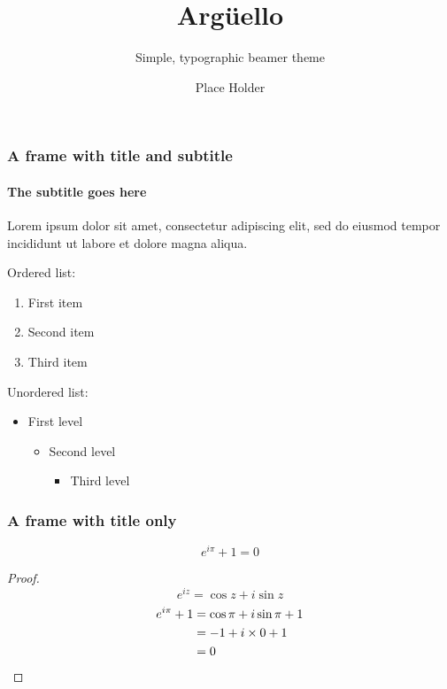 \documentclass{beamer}
\title{Argüello}
\subtitle{Simple, typographic beamer theme}
\date{}
\author{Place Holder}
\institute{University of \TeX\par\email{username@domain.com}}
\begin{document}
\frame[plain]{\titlepage}


\begin{frame}
    \frametitle{A frame with title and subtitle}
    \framesubtitle{The subtitle goes here}
    Lorem ipsum dolor sit amet, consectetur adipiscing elit, sed do eiusmod tempor incididunt ut labore et dolore magna aliqua.\par
    \vfill
    Ordered list:
    \begin{enumerate}
        \item First item
        \item Second item
        \item Third item
    \end{enumerate}
    \vfill
    Unordered list:
    \begin{itemize}
        \item First level
              \begin{itemize}
                  \item Second level
                        \begin{itemize}
                            \item Third level
                        \end{itemize}
              \end{itemize}
    \end{itemize}
\end{frame}

\begin{frame}
    \frametitle{A frame with title only}
    \begin{theorem}
        \[e^{i\pi}+1=0\]
        \begin{proof}
            \begin{equation*}
                e^{iz}=\cos{z}+i\sin{z}
            \end{equation*}
            \begin{align*}
                e^{i\pi}+1 & \null=\cos\pi+i\sin\pi+1 \\
                           & \null=-1+i\times0+1      \\
                           & \null=0
            \end{align*}
        \end{proof}
    \end{theorem}
\end{frame}
\end{document}
